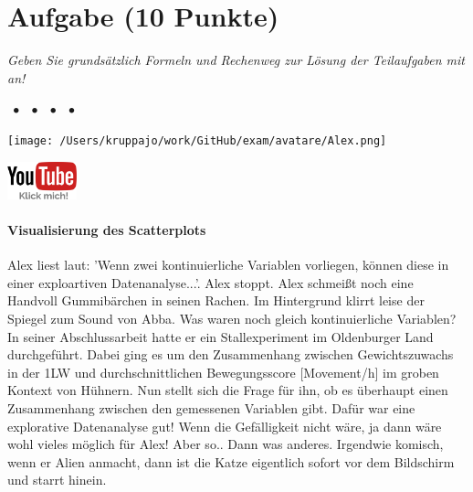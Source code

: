 \documentclass[a4paper, 9pt]{scrartcl}\usepackage[]{graphicx}\usepackage[]{xcolor}
\begin{document}
\section{Aufgabe \hfill (10 Punkte)}

\textit{Geben Sie grundsätzlich Formeln und Rechenweg zur Lösung der Teilaufgaben mit an!} \\[1Ex]
 

 
\ifcollection
\begin{flushright}
\tiny\vspace{-3Ex}
\textbf{\examinhaltstart}
\exammodulemathstat $\;\bullet$
\exammodulestat $\;\bullet$
\exammodulestatbbv $\;\bullet$
\exammodulestatversuch $\;\bullet$
\exammodulebiostat
\vspace{-4Ex}
\end{flushright}
\begin{minipage}[t]{0.5\textwidth}
\texttt{[image: /Users/kruppajo/work/GitHub/exam/avatare/Alex.png]}
\end{minipage}
\begin{minipage}[t]{0.5\textwidth}
\hfill
\href{https://youtu.be/md9I_UV5_lE}{\includegraphics[width = 2cm]{img/youtube}}
\end{minipage}
\vspace{-3ex}
\fi




\ifcollection
\paragraph{Visualisierung des Scatterplots}
\fi

Alex liest laut: 'Wenn zwei kontinuierliche Variablen vorliegen, können diese in einer exploartiven Datenanalyse...'. Alex stoppt. Alex schmeißt noch eine Handvoll Gummibärchen in seinen Rachen. Im Hintergrund klirrt leise der Spiegel zum Sound von Abba. Was waren noch gleich kontinuierliche Variablen? In seiner Abschlussarbeit hatte er ein Stallexperiment im Oldenburger Land durchgeführt. Dabei ging es um den Zusammenhang zwischen Gewichtszuwachs in der 1LW und durchschnittlichen Bewegungsscore [Movement/h] im groben Kontext von Hühnern. Nun stellt sich die Frage für ihn, ob es überhaupt einen Zusammenhang zwischen den gemessenen Variablen gibt. Dafür war eine explorative Datenanalyse gut! Wenn die Gefälligkeit nicht wäre, ja dann wäre wohl vieles möglich für Alex! Aber so.. Dann was anderes. Irgendwie komisch, wenn er Alien anmacht, dann ist die Katze eigentlich sofort vor dem Bildschirm und starrt hinein.
\end{document}
